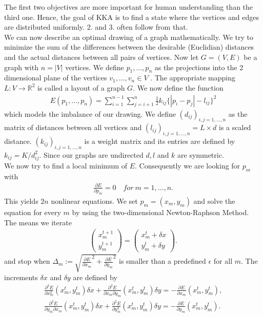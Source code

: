 \documentclass[12pt,a4paper]{article}
\begin{document}
The first two objectives are more important for human understanding than the third one. Hence, the goal of KKA is to find a state where the vertices and edges are distributed uniformly. 2. and 3. often follow from that. \\
We can now describe an optimal drawing of a graph mathematically. We try to minimize the sum of the differences between the desirable (Euclidian) distances and the actual distances between all pairs of vertices. Now let $G = (V,E)$ be a graph with $n = |V|$ vertices. We define $ p_1 , \dots, p_n$ as the projections into the 2 dimensional plane of the vertices $v_1, \dots , v_n \in V$ . The appropriate mapping $L:V\rightarrow\mathbb{R}^2$ is called a layout of a graph $G$. We now define the function
\begin{align}
\label{energyf}
E(p_1 , \dots, p_n) = \sum_{i=1}^{n-1} \sum_{j=i+1}^n \frac{1}{2} k_{ij} \lbrace | p_i - p_j | - l_{ij} \rbrace^2
\end{align}
which models the imbalance of our drawing. We define $(d_{ij})_{i,j = 1, \dots,n}$ as the matrix of distances between all vertices and $(l_{ij})_{i,j = 1, \dots,n} = L \times d $ is a scaled distance. $(k_{ij})_{i,j = 1, \dots,n}$ is a weight matrix and its entries are defined by $k_{ij} = K / d_{ij}^2$. Since our graphs are undirected $d, l$ and $k$ are symmetric. \\ 
We now try to find a local minimum of $E$. Consequently we are looking for $p_m$ with 
\begin{align*}
\frac{\partial E}{\partial p_m} = 0 \quad for \ m=1, \dots,n.
\end{align*}
This yields $2n$ nonlinear equations. We set $p_m = (x_m, y_m)$ and solve the equation for every $m$ by using the two-dimensional Newton-Raphson Method. The means we iterate
\begin{align*}
\begin{pmatrix}
x_m^{t+1} \\
y_m^{t+1}
\end{pmatrix}
=
\begin{pmatrix}
x_m^t + \delta x \\
y_m^t + \delta y
\end{pmatrix}.
\end{align*}
and stop when $\Delta_m := \sqrt{\frac{\partial E}{\partial x_m}^2 + \frac{\partial E}{\partial y_m}^2}$ is smaller than a predefined $ \epsilon$ for all $m$. 
The increments $\delta x$ and $\delta y$ are defined by
\begin{equation}
\label{NR_iteration}
\begin{aligned}
	\frac{\partial^2 E}{\partial x_m^2}(x_m^t,y_m^t) \delta x + \frac{\partial^2 E}{\partial x_m \partial y_m}(x_m^t,y_m^t) \delta y = - \frac{ \partial E}{\partial x_m} (x_m^t,y_m^t),\\	
	\frac{\partial^2 E}{\partial y_m \partial x_m}(x_m^t,y_m^t) \delta x + \frac{\partial^2 E}{\partial y_m^2}(x_m^t,y_m^t) \delta y = - \frac{ \partial E}{\partial y_m} (x_m^t,y_m^t).
\end{aligned}
\end{equation}
\end{document}
